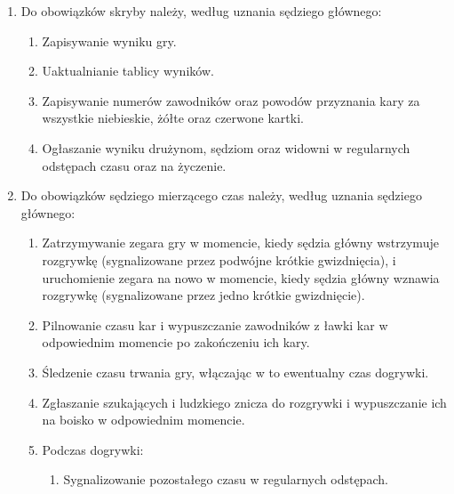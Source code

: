 \documentclass[12pt]{article}
\begin{document}
\begin{enumerate}
	\item
	      Do obowiązków skryby należy, według uznania sędziego głównego:

	      \begin{enumerate}
		      \item
		            Zapisywanie wyniku gry.
		      \item
		            Uaktualnianie tablicy wyników.
		      \item
		            Zapisywanie numerów zawodników oraz powodów przyznania kary za
		            wszystkie niebieskie, żółte oraz czerwone kartki.
		      \item
		            Ogłaszanie wyniku drużynom, sędziom oraz widowni w regularnych
		            odstępach czasu oraz na życzenie.
	      \end{enumerate}
	\item
	      Do obowiązków sędziego mierzącego czas należy, według uznania sędziego
	      głównego:

	      \begin{enumerate}
		      \item
		            Zatrzymywanie zegara gry w momencie, kiedy sędzia główny wstrzymuje
		            rozgrywkę (sygnalizowane przez podwójne krótkie gwizdnięcia), i
		            uruchomienie zegara na nowo w momencie, kiedy sędzia główny wznawia
		            rozgrywkę (sygnalizowane przez jedno krótkie gwizdnięcie).
		      \item
		            Pilnowanie czasu kar i wypuszczanie zawodników z ławki kar w
		            odpowiednim momencie po zakończeniu ich kary.
		      \item
		            Śledzenie czasu trwania gry, włączając w to ewentualny czas
		            dogrywki.
		      \item
		            Zgłaszanie szukających i ludzkiego znicza do rozgrywki i
		            wypuszczanie ich na boisko w odpowiednim momencie.
		      \item
		            Podczas dogrywki:

		            \begin{enumerate}
			            \item
			                  Sygnalizowanie pozostałego czasu w regularnych odstępach.


\end{enumerate}
\end{enumerate}
\end{enumerate}
\end{document}

